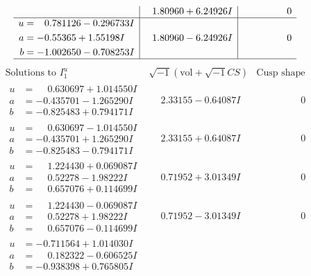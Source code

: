 \documentclass[1p]{elsarticle_modified}
\theoremstyle{definition}
\newcommand{\I}{\sqrt{-1}}
\begin{document}
$$\begin{array}{c|c|c}
 & \phantom{-}1.80960 + 6.24926 I & \phantom{-0.000000 } 0 \\ \hline\begin{aligned}
u &= \phantom{-}0.781126 - 0.296733 I \\
a &= -0.55365 + 1.55198 I \\
b &= -1.002650 - 0.708253 I\end{aligned}
 & \phantom{-}1.80960 - 6.24926 I & \phantom{-0.000000 } 0\\
 \hline 
 \end{array}$$\newpage$$\begin{array}{c|c|c}  
\text{Solutions to }I^u_{1}& \I (\text{vol} + \sqrt{-1}CS) & \text{Cusp shape}\\
 \hline 
\begin{aligned}
u &= \phantom{-}0.630697 + 1.014550 I \\
a &= -0.435701 - 1.265290 I \\
b &= -0.825483 + 0.794171 I\end{aligned}
 & \phantom{-}2.33155 - 0.64087 I & \phantom{-0.000000 } 0 \\ \hline\begin{aligned}
u &= \phantom{-}0.630697 - 1.014550 I \\
a &= -0.435701 + 1.265290 I \\
b &= -0.825483 - 0.794171 I\end{aligned}
 & \phantom{-}2.33155 + 0.64087 I & \phantom{-0.000000 } 0 \\ \hline\begin{aligned}
u &= \phantom{-}1.224430 + 0.069087 I \\
a &= \phantom{-}0.52278 - 1.98222 I \\
b &= \phantom{-}0.657076 + 0.114699 I\end{aligned}
 & \phantom{-}0.71952 + 3.01349 I & \phantom{-0.000000 } 0 \\ \hline\begin{aligned}
u &= \phantom{-}1.224430 - 0.069087 I \\
a &= \phantom{-}0.52278 + 1.98222 I \\
b &= \phantom{-}0.657076 - 0.114699 I\end{aligned}
 & \phantom{-}0.71952 - 3.01349 I & \phantom{-0.000000 } 0 \\ \hline\begin{aligned}
u &= -0.711564 + 1.014030 I \\
a &= \phantom{-}0.182322 - 0.606525 I \\
b &= -0.938398 + 0.765805 I\end{aligned}

\end{array}$$
\end{document}
